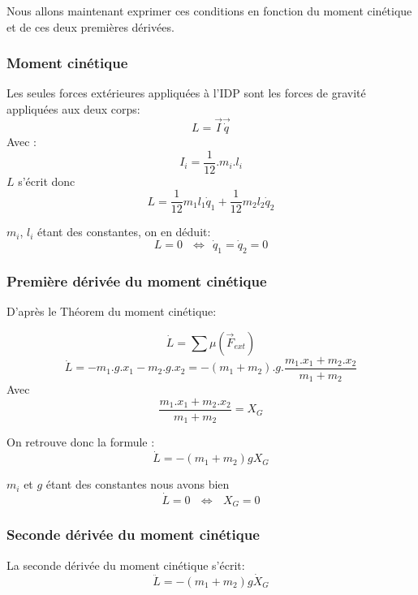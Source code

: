 \documentclass[a4paper,12pt]{report}
\begin{document}
Nous allons maintenant exprimer ces conditions en fonction du moment cinétique et de ces deux premières dérivées.

\subsubsection{Moment cinétique}
Les seules forces extérieures appliquées à l'IDP sont les forces de gravité appliquées aux deux corps:
$$ L = \overrightarrow I \overrightarrow{\dot{q}} $$
Avec : $$I_i = \frac{1}{12}.m_i.l_i$$
$L$ s'écrit donc
$$L = \frac{1}{12} m_1 l_1 \dot{q}_1 + \frac{1}{12} m_2 l_2 \dot{q}_2$$

$m_i$, $l_i$ étant des constantes, on en déduit:
$$ L = 0 \ \ \ \Leftrightarrow \ \ \dot{q}_1 = \dot{q}_2 = 0 $$

\subsubsection{Première dérivée du moment cinétique}


D'après le Théorem du moment cinétique:

$$\dot{L} = \sum{}{\mu(\overrightarrow{F}_{ext})} $$
$$\dot{L} = -m_1.g.x_1 - m_2.g.x_2 = - (m_1 + m_2).g.\frac{m_1.x_1 + m_2.x_2}{m_1 + m_2}$$
Avec $$\frac{m_1.x_1 + m_2.x_2}{m_1 + m_2} = X_G$$


On retrouve donc la formule :
$$\dot{L} = - (m_1 + m_2)g X_G$$

$m_i$ et $g$ étant des constantes nous avons bien
$$\dot{L} = 0 \ \ \ \Leftrightarrow \ \ \ X_G = 0$$

\subsubsection{Seconde dérivée du moment cinétique}
La seconde dérivée du moment cinétique s'écrit:
$$\ddot{L} = - (m_1 + m_2)g \dot{X}_G$$
\end{document}

